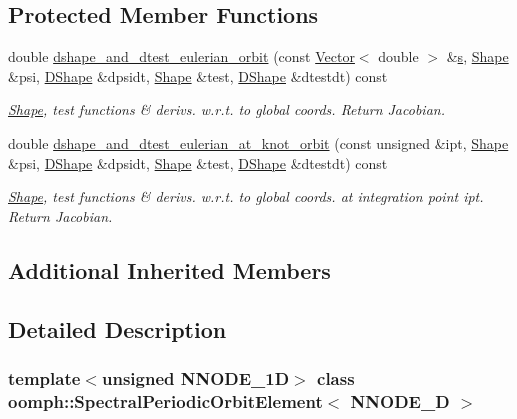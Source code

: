 \subsection*{Protected Member Functions}
\begin{DoxyCompactItemize}
\item 
double \hyperlink{classoomph_1_1SpectralPeriodicOrbitElement_a09b5fc5cee00d470952242dfea75de69}{dshape\+\_\+and\+\_\+dtest\+\_\+eulerian\+\_\+orbit} (const \hyperlink{classoomph_1_1Vector}{Vector}$<$ double $>$ \&\hyperlink{cfortran_8h_ab7123126e4885ef647dd9c6e3807a21c}{s}, \hyperlink{classoomph_1_1Shape}{Shape} \&psi, \hyperlink{classoomph_1_1DShape}{D\+Shape} \&dpsidt, \hyperlink{classoomph_1_1Shape}{Shape} \&test, \hyperlink{classoomph_1_1DShape}{D\+Shape} \&dtestdt) const
\begin{DoxyCompactList}\small\item\em \hyperlink{classoomph_1_1Shape}{Shape}, test functions \& derivs. w.\+r.\+t. to global coords. Return Jacobian. \end{DoxyCompactList}\item 
double \hyperlink{classoomph_1_1SpectralPeriodicOrbitElement_a0468d601cfa2cda0a7fc3312575bb252}{dshape\+\_\+and\+\_\+dtest\+\_\+eulerian\+\_\+at\+\_\+knot\+\_\+orbit} (const unsigned \&ipt, \hyperlink{classoomph_1_1Shape}{Shape} \&psi, \hyperlink{classoomph_1_1DShape}{D\+Shape} \&dpsidt, \hyperlink{classoomph_1_1Shape}{Shape} \&test, \hyperlink{classoomph_1_1DShape}{D\+Shape} \&dtestdt) const
\begin{DoxyCompactList}\small\item\em \hyperlink{classoomph_1_1Shape}{Shape}, test functions \& derivs. w.\+r.\+t. to global coords. at integration point ipt. Return Jacobian. \end{DoxyCompactList}\end{DoxyCompactItemize}
\subsection*{Additional Inherited Members}


\subsection{Detailed Description}
\subsubsection*{template$<$unsigned N\+N\+O\+D\+E\+\_\+1D$>$\newline
class oomph\+::\+Spectral\+Periodic\+Orbit\+Element$<$ N\+N\+O\+D\+E\+\_\+D $>$}

